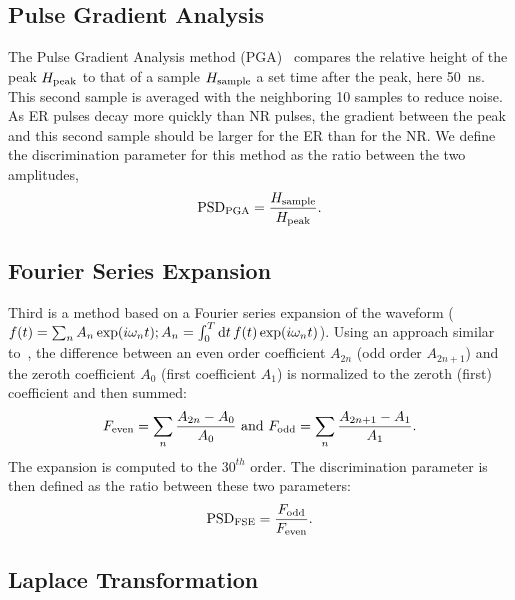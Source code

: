 \subsection{Pulse Gradient Analysis}

The Pulse Gradient Analysis method (PGA)~\cite{DMellow:2007} compares the relative height of the peak $H_{\mathrm{peak}}$ to that of a sample $H_{\mathrm{sample}}$ a set time after the peak, here 50~ns. This second sample is averaged with the neighboring 10 samples to reduce noise. As ER pulses decay more quickly than NR pulses, the gradient between the peak and this second sample should be larger for the ER than for the NR. We define the discrimination parameter for this method as the ratio between the two amplitudes,
\begin{equation}
\mathrm{PSD}_{\mathrm{PGA}} = \frac{H_{\mathrm{sample}}}{H_{\mathrm{peak}}}.
\end{equation}

\subsection{Fourier Series Expansion}

Third is a method based on a Fourier series expansion of the waveform ($f(t) = \sum_n A_n \exp (i\omega_n t); A_n = \int_0^T \mathrm{d}t\,f(t) \exp (i\omega_n t)$). Using an approach similar to~\cite{Liu:2010}, the difference between an even order coefficient $A_{2n}$ (odd order $A_{2n+1}$) and the zeroth coefficient $A_0$ (first coefficient $A_1$) is normalized to the zeroth (first) coefficient and then summed:
\begin{equation}
\displaystyle
F_{\mathrm{even}} = \sum_{n} \frac{A_{2n}-A_0}{A_0} \mathrm{~and~} F_{\mathrm{odd}} = \sum_{n} \frac{A_{2n+1}-A_1}{A_1}.
\end{equation}
The expansion is computed to the $30^{th}$ order. The discrimination parameter is then defined as the ratio between these two parameters:
\begin{equation}
\mathrm{PSD}_{\mathrm{FSE}} = \frac{F_{\mathrm{odd}}}{F_{\mathrm{even}}}.
\end{equation}


\subsection{Laplace Transformation}

